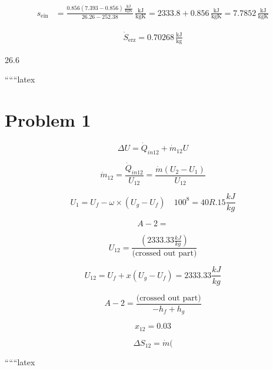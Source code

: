 \begin{align*}
s_{\text{ein}} &= \frac{0.856 (7.393 - 0.856) \, \frac{\text{kJ}}{\text{kgK}}}{26.26 - 252.38} \, \frac{\text{kJ}}{\text{kgK}} = 2333.8 + 0.856 \, \frac{\text{kJ}}{\text{kgK}} = 7.7852 \, \frac{\text{kJ}}{\text{kgK}}
\end{align*}

\begin{align*}
\dot{S}_{\text{erz}} = 0.70268 \, \frac{\text{kJ}}{\text{kg}}
\end{align*}

26.6 \, 

``````latex

\section*{Problem 1}

\[
\Delta U = \dot{Q}_{in12} + \dot{m}_{12} U
\]

\[
\dot{m}_{12} = \frac{\dot{Q}_{in12}}{U_{12}} = \frac{\dot{m}(U_2 - U_1)}{U_{12}}
\]

\[
U_1 = U_f - \omega \times (U_g - U_f) \quad 100^8 = 40R.15 \frac{kJ}{kg}
\]

\[
A-2 = 
\]

\[
U_{12} = \frac{(2333.33 \frac{kJ}{kg})}{\text{(crossed out part)}}
\]

\[
U_{12} = U_f + x(U_g - U_f) = 2333.33 \frac{kJ}{kg}
\]

\[
A-2 = \frac{\text{(crossed out part)}}{-h_f + h_g}
\]

\[
x_{12} = 0.03
\]

\[
\Delta S_{12} = \dot{m}(
\]

``````latex


